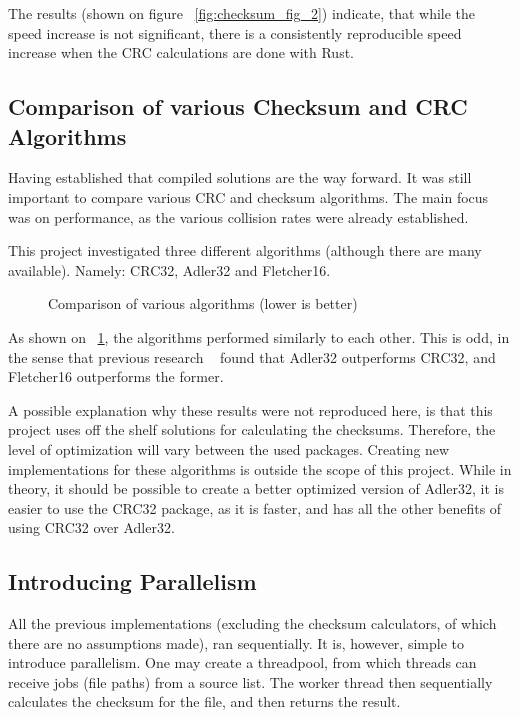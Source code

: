 The results (shown on figure ~\ref{fig:checksum_fig_2}) indicate,
that while the speed increase is not significant,
there is a consistently reproducible speed increase when the CRC calculations are done with Rust.


\subsection{Comparison of various Checksum and CRC Algorithms}

Having established that compiled solutions are the way forward.
It was still important to compare various CRC and checksum algorithms.
The main focus was on performance, as the various collision rates were already established.

This project investigated three different algorithms (although there are many available).
Namely:
CRC32, Adler32 and Fletcher16.

\begin{figure}[H]
    \centering
    \begin{bchart}[step=50,max=400, unit=s]
        \medskip
        \medskip
    \end{bchart}
    \caption{Comparison of various algorithms (lower is better)}
    \label{fig:checksum_fig_3}
\end{figure}

As shown on ~\ref{fig:checksum_fig_3}, the algorithms performed similarly to each other.
This is odd, in the sense that previous research ~\cite{MaxinoChecksum} found that Adler32 outperforms CRC32,
and Fletcher16 outperforms the former.

A possible explanation why these results were not reproduced here, is that this project uses off the shelf
solutions for calculating the checksums.
Therefore, the level of optimization will vary between the used packages.
Creating new implementations for these algorithms is outside the scope of this project.
While in theory, it should be possible to create a better optimized version of Adler32, it is easier
to use the CRC32 package, as it is faster, and has all the other benefits of using CRC32 over Adler32.

\subsection{Introducing Parallelism}
All the previous implementations (excluding the checksum calculators, of which there are no assumptions made),
ran sequentially.
It is, however, simple to introduce parallelism.
One may create a threadpool, from which threads can receive jobs (file paths) from a source list.
The worker thread then sequentially calculates the checksum for the file, and then returns the result.


